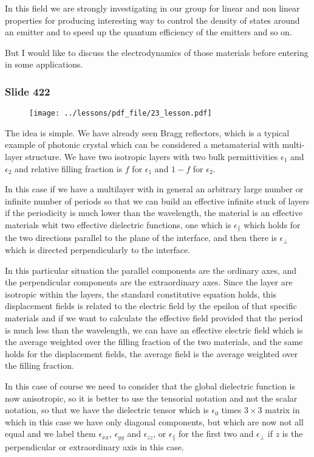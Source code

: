 \documentclass[../main/main.tex]{subfiles}
\begin{document}
In this field we are strongly investigating in our group for linear and non linear properties for producing interesting way to control the density of states around an emitter and to speed up the quantum efficiency of the emitters and so on.

But I would like to discuss the electrodynamics of those materials before entering in some applications.

\newpage

\subsubsection{Slide 422}

\begin{figure}[h!]
\centering
\texttt{[image: ../lessons/pdf\_file/23\_lesson.pdf]}
\end{figure}

The idea is simple. We have already seen Bragg reflectors, which is a typical example of photonic crystal which can be considered a metamaterial with multi-layer structure. We have two isotropic layers with two bulk permittivities $\epsilon_1$ and $\epsilon_2$ and relative filling fraction is $f$ for $\epsilon_1$ and $1-f$ for $\epsilon_2$.

In this case if we have a multilayer with in general an arbitrary large number or infinite number of periods so that we can build an effective infinite stuck of layers if the periodicity is much lower than the wavelength, the material is an effective materials whit two effective dielectric functions, one which is $\epsilon_{\parallel}$ which holds for the two directions parallel to the plane of the interface, and then there is $\epsilon_{\perp}$ which is directed perpendicularly to the interface.

In  this particular situation the parallel components are the ordinary axes, and the perpendicular components are the extraordinary axes. Since the layer are isotropic within the layers, the standard constitutive equation holds, this displacement fields is related to the electric field by the epsilon of that specific materials and if we want to calculate the effective field provided that the period is much less than the wavelength, we can have an effective electric field which is the average weighted over the filling fraction of the two materials, and the same holds for the displacement fields, the average field is the average weighted over the filling fraction.

In this case of course we need to consider that the global dielectric function is now anisotropic, so it is better to use the tensorial notation and not the scalar notation, so that we have the dielectric tensor which is $\epsilon_0$ times $3 \times 3$ matrix in which in this case we have only diagonal components, but which are now not all equal and we label them $\epsilon_{xx}$, $\epsilon_{yy}$ and $\epsilon_{zz}$, or $\epsilon_{\parallel}$ for the first two and $\epsilon_{\perp}$ if $z$ is the perpendicular or extraordinary axis in this case.
\end{document}
